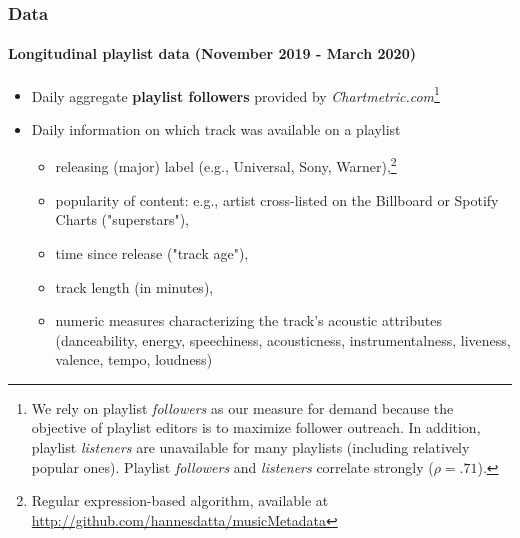 \documentclass[8pt]{beamer}
\begin{document}
\begin{frame}[label=shortversion]

\frametitle{Data}
\framesubtitle{Longitudinal playlist data (November 2019 - March 2020)}

	\begin{itemize}
    
    \item Daily aggregate \textbf{playlist followers} provided by \textit{Chartmetric.com}\footnote{We rely on playlist \textit{followers} as our measure for demand because the objective of playlist editors is to maximize follower outreach. In addition, playlist \textit{listeners} are unavailable for many playlists (including relatively popular ones). Playlist \textit{followers} and \textit{listeners} correlate strongly ($\rho = .71$).}
	\vspace{.2cm}
	\item Daily information on which track was available on a playlist
	\begin{itemize}
		\item[$\rightarrow$] releasing (major) label (e.g., Universal, Sony, Warner),\footnote{Regular expression-based algorithm, available at \url{http://github.com/hannesdatta/musicMetadata}}
		\item[$\rightarrow$] popularity of content: e.g., artist cross-listed on the Billboard or Spotify Charts ("superstars"),
		\item[$\rightarrow$] time since release ("track age"),
		\item[$\rightarrow$] track length (in minutes), 
		\item[$\rightarrow$] numeric measures characterizing the track's acoustic attributes (danceability, energy, speechiness, acousticness, instrumentalness, liveness, valence, tempo, loudness)
	\end{itemize}

	
	\end{itemize}
	
\end{frame}
\end{document}
